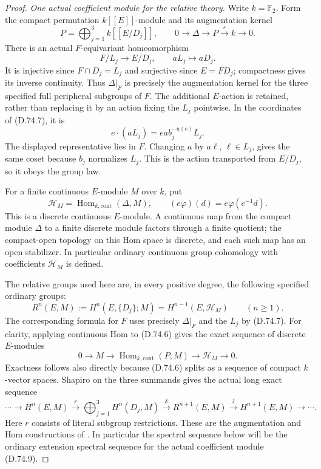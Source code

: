 \begin{proof}
\emph{One actual coefficient module for the relative theory.}
Write $k=\mathbb F_2$.  Form the compact permutation
$k[[E]]$-module and its augmentation kernel
\[
 P=\bigoplus_{j=1}^3 k[[E/D_j]],\qquad
 0\longrightarrow\Delta\longrightarrow P
             \xrightarrow{\ \varepsilon\ } k\longrightarrow0 .
 \tag{D.74.6}
\]
There is an actual $F$-equivariant homeomorphism
\[
             F/L_j\longrightarrow E/D_j,\qquad
                        aL_j\longmapsto aD_j .
 \tag{D.74.7}
\]
It is injective since $F\cap D_j=L_j$ and surjective
since $E=FD_j$; compactness gives its inverse continuity.
Thus $\Delta|_F$ is precisely the augmentation kernel
for the three specified full peripheral subgroups of
$F$.  The additional $E$-action is retained, rather
than replacing it by an action fixing the $L_j$
pointwise.  In the coordinates of (D.74.7), it is
\[
       e\cdot(aL_j)=e a b_j^{-u(e)}L_j .
 \tag{D.74.8}
\]
The displayed representative lies in $F$.  Changing
$a$ by $a\ell$, $\ell\in L_j$, gives the same coset
because $b_j$ normalizes $L_j$.  This is the action
transported from $E/D_j$, so it obeys the group law.

For a finite continuous $E$-module $M$ over $k$, put
\[
 \mathscr H_M=\operatorname{Hom}_{k,\mathrm{cont}}(\Delta,M),
 \qquad (e\varphi)(d)=e\varphi(e^{-1}d).
 \tag{D.74.9}
\]
This is a discrete continuous $E$-module.  A continuous
map from the compact module $\Delta$ to a finite
discrete module factors through a finite quotient;
the compact-open topology on this Hom space is
discrete, and each such map has an open stabilizer.
In particular ordinary continuous group cohomology
with coefficients $\mathscr H_M$ is defined.

The relative groups used here are, in every positive
degree, the following specified ordinary groups:
\[
 R^n(E,M):=H^n(E,\{D_j\};M)
       =H^{n-1}(E,\mathscr H_M)\qquad(n\geq1).
 \tag{D.74.10}
\]
The corresponding formula for $F$ uses precisely
$\Delta|_F$ and the $L_j$ by (D.74.7).
For clarity, applying continuous Hom to (D.74.6) gives
the exact sequence of discrete $E$-modules
\[
 0\longrightarrow M
 \longrightarrow\operatorname{Hom}_{k,\mathrm{cont}}(P,M)
 \longrightarrow\mathscr H_M\longrightarrow0 .
 \tag{D.74.11}
\]
Exactness follows also directly because (D.74.6)
splits as a sequence of compact $k$-vector spaces.
Shapiro on the three summands gives the actual long
exact sequence
\[
 \cdots\longrightarrow H^n(E,M)
 \xrightarrow{\ r\ }\bigoplus_{j=1}^3 H^n(D_j,M)
 \xrightarrow{\ \delta\ }R^{n+1}(E,M)
 \xrightarrow{\ j\ }H^{n+1}(E,M)\longrightarrow\cdots .
 \tag{D.74.12}
\]
Here $r$ consists of literal subgroup restrictions.
These are the augmentation and Hom constructions of
\cite[Definition~2.1, Propositions~2.3--2.4 and~2.10]
{C-WilkesRelativeAccepted2018}.  In particular the spectral sequence
below will be the ordinary extension spectral sequence
for the actual coefficient module (D.74.9).


\end{proof}
